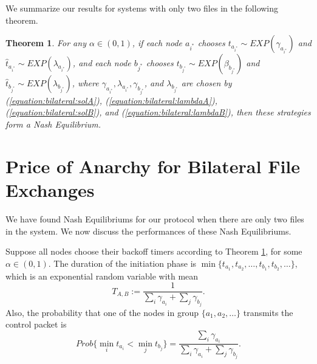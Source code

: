 \documentclass[11pt, conference]{IEEEtran}
\newtheorem{theorem}{Theorem}
\begin{document}
We summarize our results for systems with only two files in the following theorem.
\begin{theorem}	\label{theorem:bilateral:NE}
For any $\alpha\in(0,1)$, if each node $a_{i^*}$ chooses $t_{a_{i^*}}\sim EXP(\gamma_{a_{i^*}})$ and $\hat{t}_{a_{i^*}}\sim EXP(\lambda_{a_{i^*}})$, and each node $b_{j^*}$ chooses $t_{b_{j^*}}\sim EXP(\beta_{b_{j^*}})$ and $\hat{t}_{b_{j^*}}\sim EXP(\lambda_{b_{j^*}})$, where $\gamma_{a_{i^*}}, \lambda_{a_{i^*}}, \gamma_{b_{j^*}}$, and $\lambda_{b_{j^*}}$ are chosen by (\ref{equation:bilateral:solA}), (\ref{equation:bilateral:lambdaA}),  (\ref{equation:bilateral:solB}), and (\ref{equation:bilateral:lambdaB}), then these strategies form a Nash Equilibrium.
\end{theorem}



\section{Price of Anarchy for Bilateral File Exchanges}
\label{section:price of anarchy}

We have found Nash Equilibriums for our protocol when there are only two files in the system. We now discuss the performances of these Nash Equilibriums.

Suppose all nodes choose their backoff timers according to Theorem \ref{theorem:bilateral:NE}, for some $\alpha\in(0,1)$. The duration of the initiation phase is $\min\{t_{a_1}, t_{a_2},\dots, t_{b_1}, t_{b_2},\dots\}$, which is an exponential random variable with mean
\begin{equation}
T_{A,B}:=\frac{1}{\sum_{i}\gamma_{a_i}+\sum_j\gamma_{b_j}}.
\end{equation}
Also, the probability that one of the nodes in group $\{a_1,a_2,\dots\}$ transmits the control packet is
\begin{equation}
Prob\{\min_it_{a_i}<\min_jt_{b_j}\}=\frac{\sum_i\gamma_{a_i}}{\sum_{i}\gamma_{a_i}+\sum_j\gamma_{b_j}}.
\end{equation}
\end{document}
